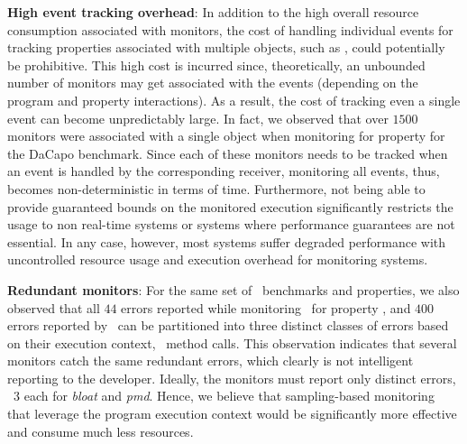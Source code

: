 \begin{challenges}
 \item \textbf{High event tracking overhead}: In addition to the high overall 
resource consumption associated with monitors, the cost of handling individual 
events for tracking properties associated with multiple objects, such as 
, could potentially be prohibitive. This high cost is 
incurred since, theoretically, an unbounded number of monitors may get 
associated with the events (depending on the program and property interactions). 
As a result, the cost of tracking even a single event can become unpredictably 
large.
% 
In fact, we observed that over $1500$ monitors were associated with a single 
 object when monitoring for  property 
for the  \textsf{DaCapo} benchmark. Since each of these monitors 
needs to be tracked when an event is handled by the corresponding receiver, 
monitoring all events, thus, becomes non-deterministic in terms of time. 
Furthermore, not being able to provide guaranteed bounds on the monitored 
execution significantly restricts the usage to non real-time systems or systems 
where performance guarantees are not essential. In any case, however, most 
systems suffer degraded performance with uncontrolled resource usage and 
execution overhead for monitoring systems.
 
 \item \textbf{Redundant monitors}: For the same set of \dacapo\ 
benchmarks and properties, we also observed that all $44$ errors reported while 
monitoring \bloat\ for property \hasnext, and $400$ errors 
reported by \pmd\ can be partitioned into three distinct classes of errors 
based on their execution context, \ie\ method calls.
% 
% 
This observation indicates that several monitors catch the same redundant 
errors, which clearly is not intelligent reporting to the developer. Ideally, 
the monitors must report only distinct errors, \ie\ $3$ each
for \textit{bloat} and \textit{pmd}. 
Hence, we believe that sampling-based monitoring that leverage the program execution 
context would be significantly more effective and consume much less resources.
\end{challenges}

